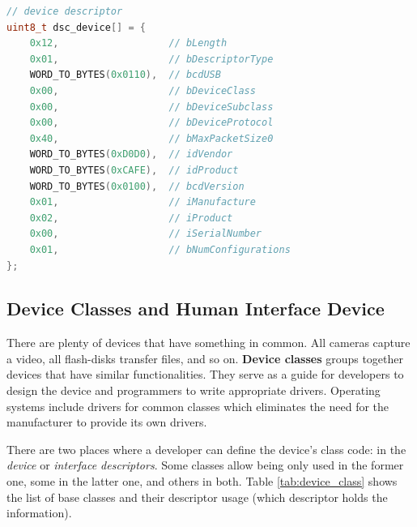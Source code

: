 \begin{lstlisting}[caption={Example of device descriptor in C language},
                   label={lst:dsc_example},
                   language=c]
// device descriptor
uint8_t dsc_device[] = {
    0x12,                   // bLength
    0x01,                   // bDescriptorType
    WORD_TO_BYTES(0x0110),  // bcdUSB
    0x00,                   // bDeviceClass
    0x00,                   // bDeviceSubclass
    0x00,                   // bDeviceProtocol
    0x40,                   // bMaxPacketSize0
    WORD_TO_BYTES(0xD0D0),  // idVendor
    WORD_TO_BYTES(0xCAFE),  // idProduct
    WORD_TO_BYTES(0x0100),  // bcdVersion
    0x01,                   // iManufacture
    0x02,                   // iProduct
    0x00,                   // iSerialNumber
    0x01,                   // bNumConfigurations
};
\end{lstlisting}

\subsection*{Device Classes and Human Interface Device}
\label{hid}
There are plenty of devices that have something in common. All cameras capture a video, all flash-disks transfer files, and so on. \textbf{Device classes} groups together devices that have similar functionalities. They serve as a guide for developers to design the device and programmers to write appropriate drivers. Operating systems include drivers for common classes which eliminates the need for the manufacturer to provide its own drivers.

There are two places where a developer can define the device's class code: in the \emph{device} or \emph{interface descriptors}. Some classes allow being only used in the former one, some in the latter one, and others in both. Table \ref{tab:device_class} shows the list of base classes and their descriptor usage (which descriptor holds the information).


